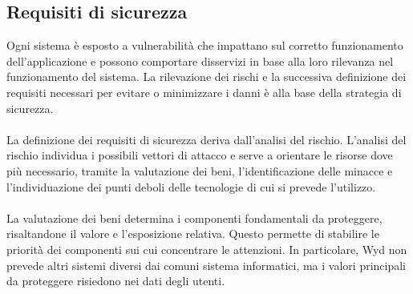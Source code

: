 \clearpage

\subsection{Requisiti di sicurezza}

Ogni sistema è esposto a vulnerabilità che impattano sul corretto funzionamento dell'applicazione
e possono comportare disservizi in base alla loro rilevanza nel funzionamento del sistema.
La rilevazione dei rischi e la successiva definizione dei requisiti necessari per evitare o minimizzare i danni
è alla base della strategia di sicurezza.\\
\\
La definizione dei requisiti di sicurezza deriva dall'analisi del rischio.
L'analisi del rischio individua i possibili vettori di attacco e serve a orientare le risorse dove più necessario,
tramite la valutazione dei beni, l'identificazione delle minacce e
l'individuazione dei punti deboli delle tecnologie di cui si prevede l'utilizzo.\\
\\
La valutazione dei beni determina i componenti fondamentali da proteggere,
risaltandone il valore e l'esposizione relativa.
Questo permette di stabilire le priorità dei componenti sui cui concentrare le attenzioni.
In particolare, Wyd non prevede altri sistemi diversi dai comuni sistema informatici,
ma i valori principali da proteggere risiedono nei dati degli utenti.\\
\\
